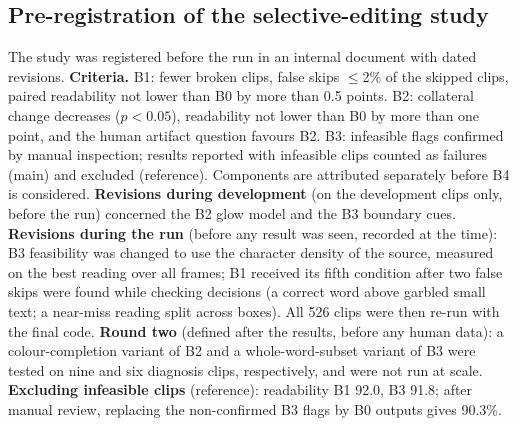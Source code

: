 \subsection{Pre-registration of the selective-editing study}
\label{sec:supp_prereg}
The study was registered before the run in an internal document with dated revisions. \textbf{Criteria.} B1: fewer broken clips, false skips $\leq$2\% of the skipped clips, paired readability not lower than B0 by more than 0.5 points. B2: collateral change decreases ($p<0.05$), readability not lower than B0 by more than one point, and the human artifact question favours B2. B3: infeasible flags confirmed by manual inspection; results reported with infeasible clips counted as failures (main) and excluded (reference). Components are attributed separately before B4 is considered. \textbf{Revisions during development} (on the development clips only, before the run) concerned the B2 glow model and the B3 boundary cues. \textbf{Revisions during the run} (before any result was seen, recorded at the time): B3 feasibility was changed to use the character density of the source, measured on the best reading over all frames; B1 received its fifth condition after two false skips were found while checking decisions (a correct word above garbled small text; a near-miss reading split across boxes). All 526 clips were then re-run with the final code. \textbf{Round two} (defined after the results, before any human data): a colour-completion variant of B2 and a whole-word-subset variant of B3 were tested on nine and six diagnosis clips, respectively, and were not run at scale. \textbf{Excluding infeasible clips} (reference): readability B1 92.0, B3 91.8; after manual review, replacing the non-confirmed B3 flags by B0 outputs gives 90.3\%.

